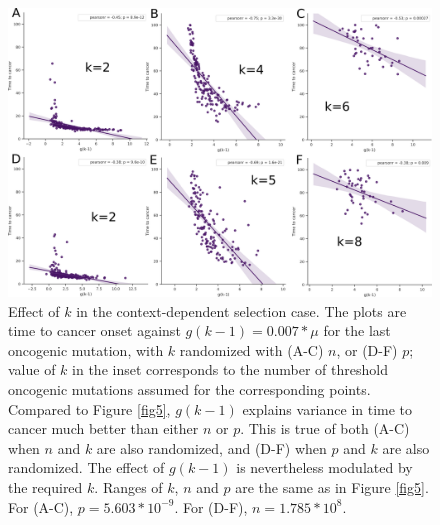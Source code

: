 \documentclass[9pt,twocolumn,twoside]{pnas-new}
\begin{document}
\begin{figure}[tbhp]
	\centering
	\includegraphics[width=.8\linewidth]{fig6.png}
	\caption{Effect of $k$ in the context-dependent selection case. The plots are time to cancer onset against $g(k-1)=0.007*\mu$ for the last oncogenic mutation, with $k$ randomized with (A-C) $n$, or (D-F) $p$; value of $k$ in the inset corresponds to the number of threshold oncogenic mutations assumed for the corresponding points. Compared to Figure \ref{fig5}, $g(k-1)$ explains variance in time to cancer much better than either $n$ or $p$. This is true of both (A-C) when $n$ and $k$ are also randomized, and (D-F) when $p$ and $k$ are also randomized. The effect of $g(k-1)$ is nevertheless modulated by the required $k$. Ranges of $k$, $n$ and $p$ are the same as in Figure \ref{fig5}. For (A-C), $p=5.603*10^{-9}$. For (D-F), $n=1.785*10^{8}$.}
	\label{fig6}
\end{figure}
\end{document}
